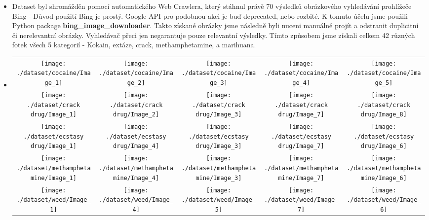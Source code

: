 \documentclass[a4paper]{article}
\newenvironment{ukol}[2][]{\begin{trivlist} 
\item[\hskip \labelsep {\bfseries #1}\hskip \labelsep {\bfseries #2}]}{\end{trivlist}}
\begin{document}
\begin{ukol}{Dataset}
\begin{itemize}
	\item Dataset byl shromážděn pomocí automatického Web Crawlera, který stáhnul právě 70 výsledků obrázkového vyhledávání prohlížeče Bing - Důvod použití Bing je prostý. Google API pro podobnou akci je buď deprecated, nebo rozbité. K tomuto účelu jsme použili Python package \textbf{bing\_image\_downloader}. Takto získané obrázky jsme následně byli nuceni manuálně projít a odstranit duplicitní či nerelevantní obrázky. Vyhledávač přeci jen negarantuje pouze relevantní výsledky. Tímto způsobem jsme získali celkem 42 různých fotek všech 5 kategorií - Kokain, extáze, crack, methamphetamine, a marihuana.
	\item \begin{center}
		\begin{tabular}{ c c c c c }
		 \texttt{[image: ./dataset/cocaine/Image\_1]} & \texttt{[image: ./dataset/cocaine/Image\_2]} & \texttt{[image: ./dataset/cocaine/Image\_3]} & \texttt{[image: ./dataset/cocaine/Image\_4]} & \texttt{[image: ./dataset/cocaine/Image\_5]} \\ 
		 \texttt{[image: ./dataset/crack drug/Image\_1]} & \texttt{[image: ./dataset/crack drug/Image\_2]} & \texttt{[image: ./dataset/crack drug/Image\_3]} & \texttt{[image: ./dataset/crack drug/Image\_7]} & \texttt{[image: ./dataset/crack drug/Image\_8]} \\  
		\texttt{[image: ./dataset/ecstasy drug/Image\_1]} & \texttt{[image: ./dataset/ecstasy drug/Image\_4]} & \texttt{[image: ./dataset/ecstasy drug/Image\_3]} & \texttt{[image: ./dataset/ecstasy drug/Image\_7]} & \texttt{[image: ./dataset/ecstasy drug/Image\_6]} \\  
		\texttt{[image: ./dataset/methamphetamine/Image\_1]} & \texttt{[image: ./dataset/methamphetamine/Image\_4]} & \texttt{[image: ./dataset/methamphetamine/Image\_3]} & \texttt{[image: ./dataset/methamphetamine/Image\_7]} & \texttt{[image: ./dataset/methamphetamine/Image\_6]} \\  
		\texttt{[image: ./dataset/weed/Image\_1]} & \texttt{[image: ./dataset/weed/Image\_4]} & \texttt{[image: ./dataset/weed/Image\_5]} & \texttt{[image: ./dataset/weed/Image\_7]} & \texttt{[image: ./dataset/weed/Image\_6]} \\  
		\end{tabular}
		\end{center}

\end{itemize}
\end{ukol}
\end{document}
